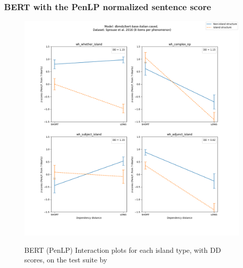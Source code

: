 \subsubsection{BERT with the PenLP normalized sentence score}
\begin{figure}[h]
	\centering
	\includegraphics[width=1\textwidth]{images/AppendixA/Sprouse_wh_dbmdz_bert-base-italian-cased_PenLP-zscores-likert-2022-09-17_h11m04s22.png} 
	\label{A-fig:sprouse_bert2b_penlp}
	\caption{BERT (PenLP) Interaction plots for each island type, with DD scores, on the test suite by \citet{sprouse2016experimental}}
\end{figure}
\clearpage
